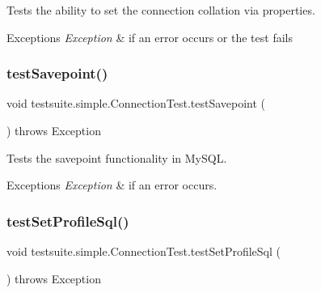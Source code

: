 Tests the ability to set the connection collation via properties.


\begin{DoxyExceptions}{Exceptions}
{\em Exception} & if an error occurs or the test fails \\
\hline
\end{DoxyExceptions}
\mbox{\label{classtestsuite_1_1simple_1_1_connection_test_a999284ad25ed2dab4c2caa40dd551b51}} 
\subsubsection{\texorpdfstring{test\+Savepoint()}{testSavepoint()}}
{\footnotesize\ttfamily void testsuite.\+simple.\+Connection\+Test.\+test\+Savepoint (\begin{DoxyParamCaption}{ }\end{DoxyParamCaption}) throws Exception}

Tests the savepoint functionality in My\+S\+QL.


\begin{DoxyExceptions}{Exceptions}
{\em Exception} & if an error occurs. \\
\hline
\end{DoxyExceptions}
\mbox{\label{classtestsuite_1_1simple_1_1_connection_test_a279c085ad223ecdc6dc0a53ed7d73abb}} 
\subsubsection{\texorpdfstring{test\+Set\+Profile\+Sql()}{testSetProfileSql()}}
{\footnotesize\ttfamily void testsuite.\+simple.\+Connection\+Test.\+test\+Set\+Profile\+Sql (\begin{DoxyParamCaption}{ }\end{DoxyParamCaption}) throws Exception}

